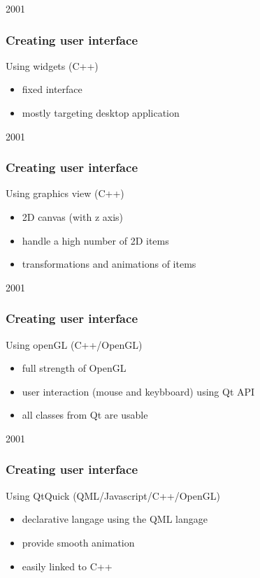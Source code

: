 
\begin{slide}{2001}\frametitle{Creating user interface}
\vspace*{1.5em}
Using widgets (C++)
\begin{itemize}
\item fixed interface
\item mostly targeting desktop application
\end{itemize}

\end{slide}


\begin{slide}{2001}\frametitle{Creating user interface}
\vspace*{1.5em}
Using graphics view (C++)
\begin{itemize}
\item 2D canvas (with z axis)
\item handle a high number of 2D items
\item transformations and animations of items
\end{itemize}

\end{slide}


\begin{slide}{2001}\frametitle{Creating user interface}
\vspace*{1.5em}
Using openGL (C++/OpenGL)
\begin{itemize}
\item full strength of OpenGL
\item user interaction (mouse and keybboard) using Qt API
\item all classes from Qt are usable
\end{itemize}

\end{slide}


\begin{slide}{2001}\frametitle{Creating user interface}
\vspace*{1.5em}
Using QtQuick (QML/Javascript/C++/OpenGL)
\begin{itemize}
\item declarative langage using the QML langage
\item provide smooth animation
\item easily linked to C++
\end{itemize}

\end{slide}

